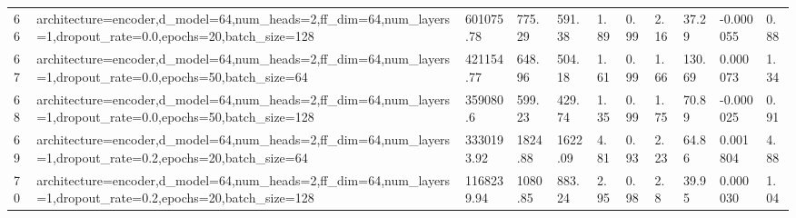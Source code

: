 \begin{longtable}{C{0.8cm} L{2cm} C{1.15cm} C{1.15cm} C{1.15cm} C{1.15cm} C{0.85cm} C{1.25cm} C{1.2cm} C{1.5cm} C{1.0cm}}
66 & architecture=encoder,\newline d\_model=64,\newline num\_heads=2,\newline ff\_dim=64,\newline num\_layers=1,\newline dropout\_rate=0.0,\newline epochs=20,\newline batch\_size=128 & 601075.78 & 775.29 & 591.38 & 1.89 & 0.99 & 2.16 & 37.29 & -0.000055 & 0.88 \\
67 & architecture=encoder,\newline d\_model=64,\newline num\_heads=2,\newline ff\_dim=64,\newline num\_layers=1,\newline dropout\_rate=0.0,\newline epochs=50,\newline batch\_size=64 & 421154.77 & 648.96 & 504.18 & 1.61 & 0.99 & 1.66 & 130.69 & 0.000073 & 1.34 \\
68 & architecture=encoder,\newline d\_model=64,\newline num\_heads=2,\newline ff\_dim=64,\newline num\_layers=1,\newline dropout\_rate=0.0,\newline epochs=50,\newline batch\_size=128 & 359080.6 & 599.23 & 429.74 & 1.35 & 0.99 & 1.75 & 70.89 & -0.000025 & 0.91 \\
69 & architecture=encoder,\newline d\_model=64,\newline num\_heads=2,\newline ff\_dim=64,\newline num\_layers=1,\newline dropout\_rate=0.2,\newline epochs=20,\newline batch\_size=64 & 3330193.92 & 1824.88 & 1622.09 & 4.81 & 0.93 & 2.23 & 64.86 & 0.001804 & 4.88 \\
70 & architecture=encoder,\newline d\_model=64,\newline num\_heads=2,\newline ff\_dim=64,\newline num\_layers=1,\newline dropout\_rate=0.2,\newline epochs=20,\newline batch\_size=128 & 1168239.94 & 1080.85 & 883.24 & 2.95 & 0.98 & 2.8 & 39.95 & 0.000030 & 1.04 \\

\end{longtable}
